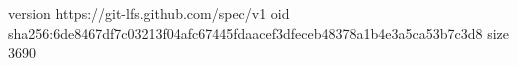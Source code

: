 version https://git-lfs.github.com/spec/v1
oid sha256:6de8467df7c03213f04afc67445fdaacef3dfeceb48378a1b4e3a5ca53b7c3d8
size 3690
